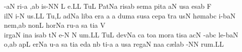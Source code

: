 -\clivis aN\egn
\sgn ri-\punctum a\egn
\sgn {}{\ae},\pes ab\egn
\spatium
{}i{s-}\punctum N\augmentum N\egn
\custos L\lineaproxima
e.\punctum L\augmentum L\egn
\spatium
\divisiofinalis
\spatium
\sgn Tu{}\punctum L\egn
\spatium
\sgn Pat\pes Na\egn
\sgn ris\punctum a\augmentum b\egn
\spatium
\divisiominor
\spatium
\sgn sem\punctum a\egn
\sgn pit\punctum a\egn
{}\clivis aN\egn
\sgn {}us\punctum a\egn
\spatium
\sgn {}es\pes ab\egn
\spatium
\sgn F{\\i}l\punctum N\egn
\sgn {}i-\punctum N\egn
\sgn {}u{s.}\punctum L\augmentum L\egn
\spatium
\divisiofinalis
\spatium
\sgn Tu{,}\punctum L\egn
\spatium
\sgn {}ad\epiphonus Na\egn
\spatium
\sgn lib\punctum a\egn
\sgn {}er\punctum a\egn
{}\punctum a\egn
\custos a\lineaproxima
\sgn dum\punctum a\egn
\spatium
\sgn sus\punctum a\egn
\sgn cep\punctum a\egn
\sgn t{\u}r\punctum a\egn
\sgn {}us\punctum N\egn
\spatium
\sgn h{\o}m\quilismascandicus abc\egn
\sgn {}i-\climacus baN\egn
\sgn ne{m,}\punctum a\augmentum b\egn
\spatium
\divisiominor
\spatium
\sgn non\punctum L\egn
\spatium
\sgn hor\pes Na\egn
\sgn ru-\punctum a\egn
\sgn {}{\\i}s\punctum a\egn
\sgn ti{}\punctum a\egn
\spatium
\sgn V{\\i}{rg}\clivis aN\egn
\sgn {}in\punctum a\egn
\sgn {}is\pes ab\egn
\spatium
\sgn {}{\u}t\punctum N\egn
\sgn {}e-\punctum N\egn
\custos N\lineaproxima
\sgn {}u{m.}\punctum L\augmentum L\egn
\spatium
\divisiofinalis
\spatium
\sgn Tu{}\punctum L\egn
\spatium
\sgn dev\pes Na\egn
\sgn {}{\\i}c\punctum a\egn
\sgn to{}\punctum a\egn
\spatium
\sgn mor\punctum a\egn
\sgn tis\punctum a\egn
\spatium
\sgn {}ac\punctum N\egn
\sgn {}{\u}-\quilismascandicus abc\egn
\sgn le-\climacus baN\egn
\sgn {}o,\punctum a\augmentum b\egn
\spatium
\divisiominor
\spatium
\sgn {}ap\punctum L\egn
\sgn {}er\pes Na\egn
\sgn {}u-\punctum a\egn
\sgn {}{\\i}s\punctum a\egn
\sgn ti{}\punctum a\egn
\spatium
{}ed\punctum a\egn
\sgn {}{\e}n\punctum b\egn
\sgn ti-\punctum a\egn
\custos a\lineaproxima
us\punctum a\egn
\spatium
\sgn reg\clivis aN\egn
\sgn na{}\punctum a\egn
\spatium
\sgn c{\ae}l\pes ab\egn
\sgn {}{\o}-\punctum N\augmentum N\egn
\sgn ru{m.}\punctum L\augmentum L\egn
